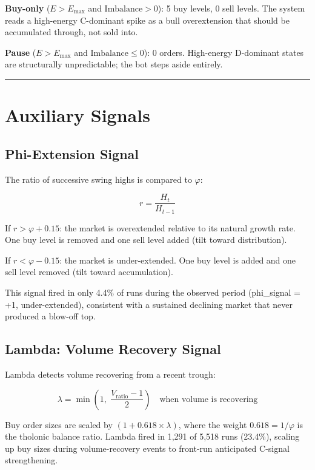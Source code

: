 \documentclass[12pt]{article}
\begin{document}
\textbf{Buy-only} (\(E > E_{\text{max}}\) and \(\text{Imbalance} > 0\)):
5 buy levels, 0 sell levels. The system reads a high-energy C-dominant
spike as a bull overextension that should be accumulated through, not
sold into.

\textbf{Pause} (\(E > E_{\text{max}}\) and \(\text{Imbalance} \leq 0\)):
0 orders. High-energy D-dominant states are structurally unpredictable;
the bot steps aside entirely.

\begin{center}\rule{0.5\linewidth}{0.5pt}\end{center}

\section{Auxiliary Signals}\label{auxiliary-signals}

\subsection{Phi-Extension Signal}\label{phi-extension-signal}

The ratio of successive swing highs is compared to \(\varphi\):

\[r = \frac{H_{t}}{H_{t-1}}\]

If \(r > \varphi + 0.15\): the market is overextended relative to its
natural growth rate. One buy level is removed and one sell level added
(tilt toward distribution).

If \(r < \varphi - 0.15\): the market is under-extended. One buy level
is added and one sell level removed (tilt toward accumulation).

This signal fired in only 4.4\% of runs during the observed period
(phi\_signal = +1, under-extended), consistent with a sustained
declining market that never produced a blow-off top.

\subsection{Lambda: Volume Recovery Signal}\label{lambda-volume-recovery-signal}

Lambda detects volume recovering from a recent trough:

\[\lambda = \min\!\left(1,\; \frac{V_{\text{ratio}} - 1}{2}\right) \quad \text{when volume is recovering}\]

Buy order sizes are scaled by \((1 + 0.618 \times \lambda)\), where the
weight \(0.618 = 1/\varphi\) is the tholonic balance ratio. Lambda fired
in 1,291 of 5,518 runs (23.4\%), scaling up buy sizes during
volume-recovery events to front-run anticipated C-signal strengthening.
\end{document}
